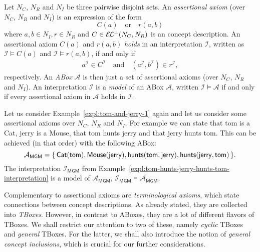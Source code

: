\begin{Definition}
  \label{def:assertional-axiom-and-ABox}
  Let $N_C$, $N_R$ and $N_I$ be three pairwise disjoint sets.  An \emph{assertional axiom}
  (over $N_C$, $N_R$ and $N_I$) is an expression of the form
  \begin{equation*}
    C(a) \quad\text{or}\quad r(a, b)
  \end{equation*}
  where $a, b \in N_I, r \in N_R$ and $C \in {\ensuremath{{\mathcal{E}\kern-.3ex\mathcal{L}}^\bot}}(N_C, N_R)$ is an \ELbot concept
  description.  An assertional axiom $C(a)$ and $r(a,b)$ \emph{holds} in an interpretation
  $\mathcal{I}$, written as $\mathcal{I} \models C(a)$ and $\mathcal{I} \models r(a, b)$,
  if and only if
  \begin{align*}
    a^{\mathcal{I}} \in C^{\mathcal{I}} \quad\text{and}\quad (a^{\mathcal{I}},
    b^{\mathcal{I}}) \in r^{\mathcal{I}},
  \end{align*}
  respectively.  An \emph{ABox} $\mathcal{A}$ is then just a set of assertional axioms
  (over $N_C$, $N_R$ and $N_I$).  An interpretation $\mathcal{I}$ is a \emph{model} of an
  ABox $\mathcal{A}$, written $\mathcal{I} \models \mathcal{A}$ if and only if every
  assertional axiom in $\mathcal{A}$ holds in $\mathcal{I}$.
\end{Definition}

\begin{Example}
  \label{expl:tom-and-jerry-ABox}
  Let us consider Example~\ref{expl:tom-and-jerry-1} again and let us consider some
  assertional axioms over $N_C$, $N_R$ and $N_I$.  For example we can state that
  \textsf{tom} is a \textsf{Cat}, \textsf{jerry} is a \textsf{Mouse}, that \textsf{tom}
  \textsf{hunts} \textsf{jerry} and that \textsf{jerry} \textsf{hunts} \textsf{tom}.  This
  can be achieved (in that order) with the following ABox:
  \begin{equation*}
    \mathcal{A}_{\mathsf{MGM}} = {\{\, \mathsf{Cat}(\mathsf{tom}), \mathsf{Mouse}(\mathsf{jerry}),
      \mathsf{hunts}(\mathsf{tom}, \mathsf{jerry}),
      \mathsf{hunts}(\mathsf{jerry}, \mathsf{tom}) \,\}}.
  \end{equation*}
  The interpretation $\mathcal{I}_{\mathsf{MGM}}$ from
  Example~\ref{expl:tom-hunts-jerry-hunts-tom-interpretation} is a model of
  $\mathcal{A}_{\mathsf{MGM}}$, \ie $\mathcal{I}_{\mathsf{MGM}} \models
  \mathcal{A}_{\mathsf{MGM}}$.
\end{Example}

Complementary to assertional axioms are \emph{terminological axioms}, which state
connections between concept descriptions.  As already stated, they are collected into
\emph{TBoxes}.  However, in contrast to ABoxes, they are a lot of different flavors of
TBoxes.  We shall restrict our attention to two of these, namely \emph{cyclic} TBoxes and
\emph{general} TBoxes.  For the latter, we shall also introduce the notion of
\emph{general concept inclusions}, which is crucial for our further considerations.

